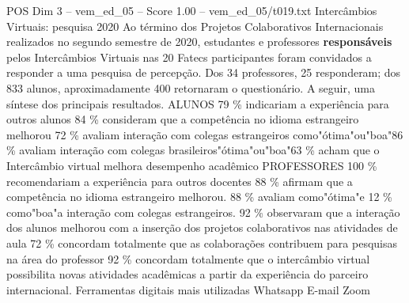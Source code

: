 \begin{textsample}{POS Dim 3 – vem\_ed\_05 – Score 1.00 – vem\_ed\_05/t019.txt}  \label{ex:f3_pos_124}
Intercâmbios Virtuais: pesquisa 2020 Ao término dos Projetos Colaborativos Internacionais realizados no segundo semestre de 2020, estudantes e professores \textbf{responsáveis} pelos Intercâmbios Virtuais nas 20 Fatecs participantes foram convidados a responder a uma pesquisa de percepção.
Dos 34 professores, 25 responderam; dos 833 alunos, aproximadamente 400 retornaram o questionário.
A seguir, uma síntese dos principais resultados.
ALUNOS 79 \% indicariam a experiência para outros alunos 84 \% consideram que a competência no idioma estrangeiro melhorou 72 \% avaliam interação com colegas estrangeiros como"ótima"ou"boa"86 \% avaliam interação com colegas brasileiros"ótima"ou"boa"63 \% acham que o Intercâmbio virtual melhora desempenho acadêmico PROFESSORES 100 \% recomendariam a experiência para outros docentes 88 \% afirmam que a competência no idioma estrangeiro melhorou. 88 \% avaliam como"ótima"e 12 \% como"boa"a interação com colegas estrangeiros. 92 \% observaram que a interação dos alunos melhorou com a inserção dos projetos colaborativos nas atividades de aula 72 \% concordam totalmente que as colaborações contribuem para pesquisas na área do professor 92 \% concordam totalmente que o intercâmbio virtual possibilita novas atividades acadêmicas a partir da experiência do parceiro internacional.
Ferramentas digitais mais utilizadas Whatsapp E-mail Zoom

\end{textsample}
